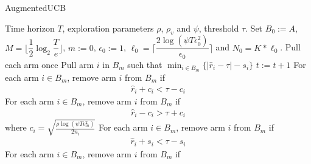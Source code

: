 \begin{algorithm}[th!]
\caption{AugmentedUCB}
\label{alg:augucb}
\begin{algorithmic}
 Time horizon $T$, exploration parameters $\rho$, $\rho_v$ and $\psi$, threshold $\tau$.
 Set $B_{0}:=A$, $M=\bigg\lfloor \dfrac{1}{2}\log_{2} \dfrac{T}{e}\bigg\rfloor $, $m:=0$, $\epsilon_{0}:=1$, $\ell_{0}=\big\lceil \dfrac{2\log(\psi T\epsilon_{0}^{2})}{\epsilon_{0}} \big\rceil$ and $N_{0}=K*\ell_{0} $.
\State Pull each arm once
\State {}
\State Pull arm $i$ in $B_m$ such that $\min_{i\in B_{m}}\bigg\lbrace |\hat{r}_{i} - \tau | - s_{i}\bigg\rbrace$
\State $t:=t+1$ 
\ArmElim
\State For each arm $i \in B_{m}$, remove arm ${i}$ from $B_{m}$ if
\begin{align*}
\hat{r}_{i} + c_i  < \tau - c_i
\end{align*}
\State For each arm $i \in B_{m}$, remove arm ${i}$ from $B_{m}$ if
\begin{align*}
\hat{r}_{i} - c_i  > \tau + c_i
\end{align*}
where $ c_i=\sqrt{\frac{\rho\log{(\psi T\epsilon_{m}^{2})}}{2 n_{i}}} $
\EndArmElim
\ArmElimV
\State For each arm $i \in B_{m}$, remove arm ${i}$ from $B_{m}$ if
\begin{align*}
\hat{r}_{i} + s_i  < \tau - s_i 
\end{align*}
\State For each arm $i \in B_{m}$, remove arm ${i}$ from $B_{m}$ if
\begin{align*}

\end{align*}
\end{algorithmic}
\end{algorithm}
